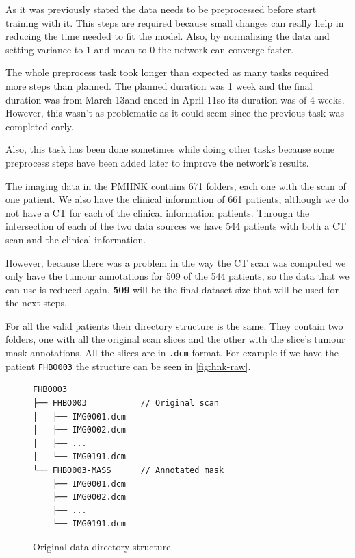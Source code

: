 



As it was previously stated the data needs to be preprocessed before start training with it.
This steps are required because small changes can really help in reducing the time needed to
fit the model. Also, by normalizing the data and setting variance to 1 and mean to 0 the network
can converge faster.
~\cite{neural:efficient-backprop}

The whole preprocess task took longer than expected as many tasks required more steps than 
planned. The planned duration was 1 week and the final duration was from March 13\Th and
ended in April 11\Th so its duration was of 4 weeks. However, this wasn't as problematic as 
it could seem since the previous task was completed early.

Also, this task has been done sometimes while doing other tasks because some preprocess 
steps have been added later to improve the network's results.


The imaging data in the \Gls{PMHNK} contains 671 folders, each one with the scan of one patient. 
We also have the clinical information of 661 patients, although we do not have a \gls{CT} for
each of the clinical information patients. Through the intersection of each of the two data
sources we have 544 patients with both a \gls{CT} scan and the clinical information.

However, because there was a problem in the way the \gls{CT} scan was computed we only have
the tumour annotations for 509 of the 544 patients, so the data that we can use is reduced
again. \textbf{509} will be the final dataset size that will be used for the next 
steps.

For all the valid patients their directory structure is the same. They contain two folders,
one with all the original scan slices and the other with the slice's tumour mask annotations. 
All the slices are in \verb|.dcm| format.
For example if we have the patient \texttt{FHBO003} the structure can be seen in 
\autoref{fig:hnk-raw}.

\begin{figure}
  \centering
  \begin{minipage}{0.8\textwidth}
    \begin{Verbatim}[samepage=true]
FHBO003
├── FHBO003           // Original scan
│   ├── IMG0001.dcm
│   ├── IMG0002.dcm
│   ├── ...
│   └── IMG0191.dcm
└── FHBO003-MASS      // Annotated mask
    ├── IMG0001.dcm
    ├── IMG0002.dcm
    ├── ...
    └── IMG0191.dcm
    \end{Verbatim}
  \end{minipage}
    
  \caption{Original data directory structure \label{fig:hnk-raw}}
\end{figure}

